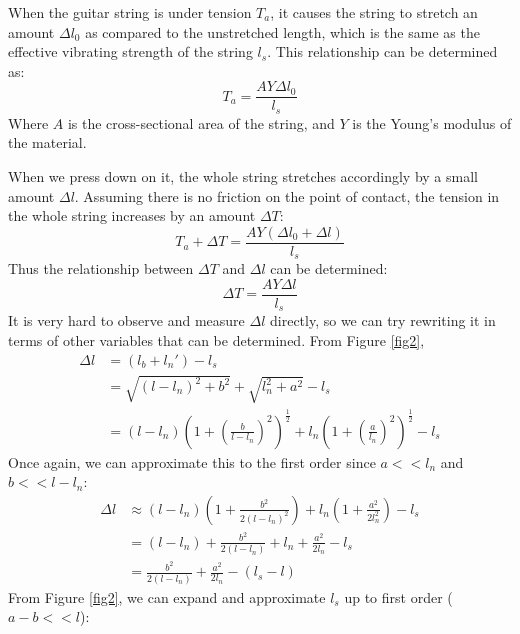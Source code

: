 When the guitar string is under tension $T_a$, it causes the string to stretch an amount $\Delta l_0$ as compared to the unstretched length, which is the same as the effective vibrating strength of the string $l_s$. This relationship can be determined as:
\begin{equation}
    T_a = \frac{AY\Delta l_0}{l_s}\label{eqn18}
\end{equation} 
Where $A$ is the cross-sectional area of the string, and $Y$ is the Young's modulus of the material. \cite{polak}

When we press down on it, the whole string stretches accordingly by a small amount $\Delta l$. Assuming there is no friction on the point of contact, the tension in the whole string increases by an amount $\Delta T$:
\begin{equation}
    T_a + \Delta T = \frac{AY(\Delta l_0 + \Delta l)}{l_s}\label{eqn19}
\end{equation}
Thus the relationship between $\Delta T$ and $\Delta l$ can be determined:
\begin{equation}
    \Delta T = \frac{AY\Delta l}{l_s}\label{eqn20}
\end{equation} 
It is very hard to observe and measure $\Delta l$ directly, so we can try rewriting it in terms of other variables that can be determined. From Figure \ref{fig2},  
\begin{align}
    \Delta l &= (l_b + l_n') - l_s \\
    &= \sqrt{(l-l_n)^2+b^2} + \sqrt{l_n^2+a^2} - l_s \\
    &= (l-l_n)\left(1+\left(\frac{b}{l-l_n}\right)^2\right)^{\frac{1}{2}} + l_n\left(1+\left(\frac{a}{l_n}\right)^2\right)^{\frac{1}{2}} - l_s
\end{align}
Once again, we can approximate this to the first order since $a << l_n$ and $b << l-l_n $:
\begin{align}
    \Delta l &\approx (l-l_n)\left(1+\frac{b^2}{2(l-l_n)^2}\right)+ l_n\left(1+\frac{a^2}{2l_n^2}\right) - l_s \label{eqn24} \\
    &= (l - l_n) + \frac{b^2}{2(l-l_n)} + l_n + \frac{a^2}{2l_n} - l_s \label{eqn25} \\
    &= \frac{b^2}{2(l-l_n)} + \frac{a^2}{2l_n} - (l_s - l) \label {eqn26}
\end{align}
From Figure \ref{fig2}, we can expand and approximate $l_s$ up to first order ($a-b << l$):

